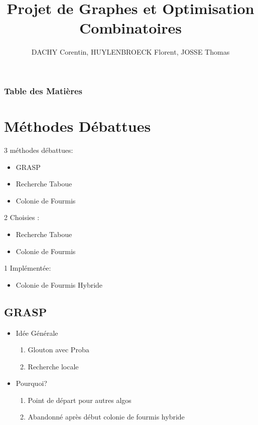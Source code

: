 \documentclass[b]{beamer}
\title[Projet de Graphes et Optimisation Combinatoire]{Projet de Graphes et Optimisation Combinatoires}
\author{DACHY Corentin, HUYLENBROECK Florent, JOSSE Thomas}
\begin{document}
\begin{frame}
	\titlepage
\end{frame}

\begin{frame}
	\frametitle{Table des Matières}
	\tableofcontents
\end{frame}

\section{Méthodes Débattues}

\begin{frame}
	
	3 méthodes débattues:
	\begin{itemize}
		\item GRASP
		\item Recherche Taboue
		\item Colonie de Fourmis
	\end{itemize}
	2 Choisies :
		\begin{itemize}
			\item Recherche Taboue
			\item Colonie de Fourmis
		\end{itemize}
	1 Implémentée:
		\begin{itemize}
			\item Colonie de Fourmis Hybride
		\end{itemize}
\end{frame}

\subsection{GRASP}

\begin{frame}

\begin{itemize}
	\item Idée Générale
	\begin{enumerate}
		\item Glouton avec Proba
		\item Recherche locale 
	\end{enumerate}
	\item Pourquoi? 
	\begin{enumerate}
		\item Point de départ pour autres algos
		\item Abandonné après début colonie de fourmis hybride
	\end{enumerate}
\end{itemize}

\end{frame}
\end{document}
